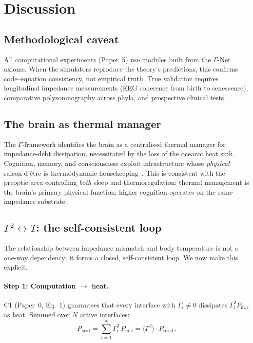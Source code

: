 \documentclass[aps,pre,twocolumn,superscriptaddress,floatfix]{revtex4-2}
\begin{document}
\section{Discussion}
\label{sec:discussion}

\subsection{Methodological caveat}

All computational experiments (Paper~5) use modules
built from the $\Gamma$-Net axioms.
When the simulators reproduce the theory's predictions,
this confirms code--equation consistency, not empirical
truth.
True validation requires longitudinal impedance measurements
(EEG coherence from birth to senescence), comparative
polysomnography across phyla, and prospective clinical tests.

\subsection{The brain as thermal manager}

The $\Gamma$-framework identifies the brain as a
centralised thermal manager for impedance-debt
dissipation, necessitated by the loss of the oceanic
heat sink.
Cognition, memory, and consciousness exploit
infrastructure whose \emph{physical} raison d'\^etre is
thermodynamic housekeeping~\cite{Torday2016}.
This is consistent with the preoptic area controlling
\emph{both} sleep and thermoregulation:
thermal management is the brain's primary physical
function; higher cognition operates on the same
impedance substrate.

\subsection{$\Gamma^2 \!\leftrightarrow\! T$: the self-consistent loop}
\label{sec:gamma-T-loop}

The relationship between impedance mismatch and body
temperature is not a one-way dependency; it forms a
closed, self-consistent loop.  We now make this explicit.

\paragraph{Step 1: Computation $\to$ heat.}
C1 (Paper~0, Eq.~1) guarantees that every interface
with $\Gamma_i \neq 0$ dissipates $\Gamma_i^2
P_{\mathrm{in},i}$ as heat.  Summed over $N$ active
interfaces:
\begin{equation}
  P_{\mathrm{heat}} = \sum_{i=1}^{N} \Gamma_i^2\, P_{\mathrm{in},i}
  = \langle \Gamma^2 \rangle \cdot P_{\mathrm{total}}\,.
  \label{eq:loop-step1}
\end{equation}
\end{document}
